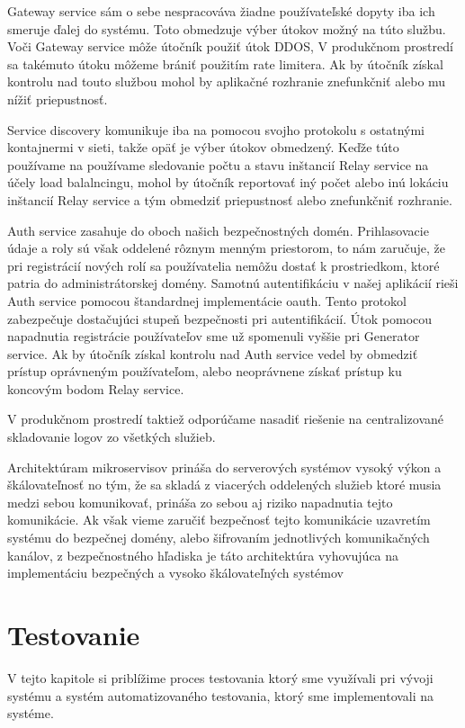 Gateway service sám o sebe nespracováva žiadne používateľské dopyty iba ich smeruje ďalej do systému. Toto obmedzuje výber útokov možný na túto službu. Voči Gateway service môže útočník použiť útok DDOS, V produkčnom prostredí sa takémuto útoku môžeme brániť použitím rate limitera. Ak by útočník získal kontrolu nad touto službou mohol by aplikačné rozhranie znefunkčniť alebo mu nížiť priepustnosť.

Service discovery komunikuje iba na pomocou svojho protokolu s ostatnými kontajnermi v sieti, takže opäť je výber útokov obmedzený. Keďže túto používame na používame sledovanie počtu a stavu inštancií Relay service na účely load balalncingu, mohol by útočník reportovať iný počet alebo inú lokáciu inštancií Relay service a tým obmedziť priepustnosť alebo znefunkčniť rozhranie.

Auth service zasahuje do oboch našich bezpečnostných domén. Prihlasovacie údaje a roly sú však oddelené rôznym menným priestorom, to nám zaručuje, že pri registrácií nových rolí sa používatelia nemôžu dostať k prostriedkom, ktoré patria do administrátorskej domény. Samotnú
autentifikáciu v našej aplikácií rieši Auth service pomocou štandardnej implementácie \acrshort{oauth}. Tento protokol zabezpečuje dostačujúci stupeň bezpečnosti pri autentifikácií. Útok pomocou napadnutia registrácie používateľov sme už spomenuli vyššie pri Generator service. Ak by útočník získal kontrolu nad Auth service vedel by obmedziť prístup oprávneným používateľom, alebo neoprávnene získať prístup ku koncovým bodom Relay service.

V produkčnom prostredí taktiež odporúčame nasadiť riešenie na centralizované skladovanie logov zo všetkých služieb.

Architektúram mikroservisov prináša do serverových systémov vysoký výkon a škálovateľnosť no tým, že sa skladá z viacerých oddelených služieb ktoré musia medzi sebou komunikovať, prináša zo sebou aj riziko napadnutia tejto komunikácie. Ak však vieme zaručiť bezpečnosť tejto komunikácie uzavretím systému do bezpečnej domény, alebo šifrovaním jednotlivých komunikačných kanálov, z bezpečnostného hľadiska je táto architektúra vyhovujúca na  implementáciu bezpečných a vysoko škálovateľných systémov


\section{Testovanie}
V tejto kapitole si priblížime proces testovania ktorý sme využívali pri vývoji systému a systém automatizovaného testovania, ktorý sme implementovali na systéme.

